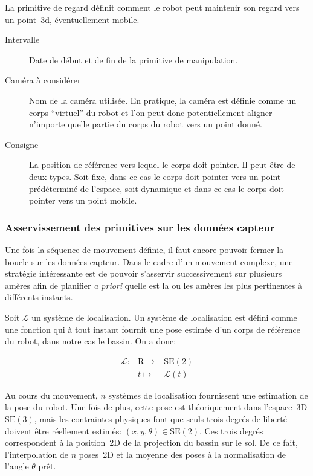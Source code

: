 La primitive de regard définit comment le robot peut maintenir son
regard vers un point 3d, éventuellement mobile.

\begin{description}
\item[Intervalle] Date de début et de fin de la primitive de manipulation.
\item[Caméra à considérer] Nom de la caméra utilisée. En pratique, la
  caméra est définie comme un corps ``virtuel'' du robot et l'on peut
  donc potentiellement aligner n'importe quelle partie du corps du
  robot vers un point donné.
\item[Consigne] La position de référence vers lequel le corps doit
  pointer. Il peut être de deux types. Soit fixe, dans ce cas le corps
  doit pointer vers un point prédéterminé de l'espace, soit dynamique
  et dans ce cas le corps doit pointer vers un point mobile.
\end{description}


\subsubsection{Asservissement des primitives sur les données capteur}


Une fois la séquence de mouvement définie, il faut encore pouvoir
fermer la boucle sur les données capteur. Dans le cadre d'un mouvement
complexe, une stratégie intéressante est de pouvoir s'asservir
successivement sur plusieurs amères afin de planifier \emph{a priori}
quelle est la ou les amères les plus pertinentes à différents instants.


Soit $\mathcal{L}$ un système de localisation. Un système de
localisation est défini comme une fonction qui à tout instant fournit
une pose estimée d'un corps de référence du robot, dans notre cas le
bassin. On a donc:

\begin{equation}
  \begin{array}{ccc}
    \mathcal{L} : & \mathrm{R} \rightarrow & \text{SE}(2)\\
      & t \mapsto & \mathcal{L}(t)
  \end{array}
\end{equation}

Au cours du mouvement, $n$ systèmes de localisation fournissent une
estimation de la pose du robot. Une fois de plus, cette pose est
théoriquement dans l'espace 3D $\text{SE}(3)$, mais les contraintes
physiques font que seuls trois degrés de liberté doivent être
réellement estimés: $(x, y, \theta) \in \text{SE}(2)$. Ces trois
degrés correspondent à la position 2D de la projection du bassin sur
le sol. De ce fait, l'interpolation de $n$ poses 2D et la moyenne des
poses à la normalisation de l'angle $\theta$ prêt.


